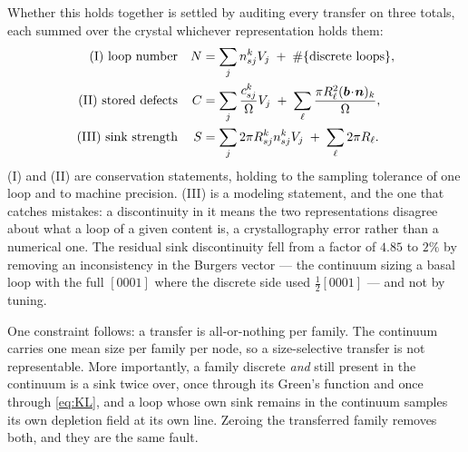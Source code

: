 Whether this holds together is settled by auditing every transfer on three
totals, each summed over the crystal whichever representation holds them:
\begin{align}
  \text{(I) loop number} &&
    N &= \sum_j n^k_{sj}V_j \;+\; \#\{\text{discrete loops}\}, \nonumber\\
  \text{(II) stored defects} &&
    C &= \sum_j \frac{c^k_{sj}}{\Omega}V_j
         \;+\; \sum_\ell \frac{\pi R_\ell^{2}(\bm{b}\!\cdot\!\bm{n})_k}{\Omega},
         \label{eq:ledger}\\
  \text{(III) sink strength} &&
    S &= \sum_j 2\pi R^k_{sj}n^k_{sj}V_j \;+\; \sum_\ell 2\pi R_\ell . \nonumber
\end{align}
(I) and (II) are conservation statements, holding to the sampling tolerance of
one loop and to machine precision. (III) is a modeling statement, and the one
that catches mistakes: a discontinuity in it means the two representations
disagree about what a loop of a given content is, a crystallography error rather
than a numerical one. The residual sink discontinuity fell from a
factor of $4.85$ to $2\%$ by removing an inconsistency in the \cloop{} Burgers
vector --- the continuum sizing a basal loop with the full $[0001]$ where the
discrete side used $\tfrac12[0001]$ --- and not by tuning.

One constraint follows: a transfer is all-or-nothing per family. The continuum
carries one mean size per family per node, so a size-selective transfer is not
representable. More importantly, a family discrete \emph{and} still present in
the continuum is a sink twice over, once through its Green's function and once
through \cref{eq:KL}, and a loop whose own sink remains in the continuum samples
its own depletion field at its own line. Zeroing the transferred family removes
both, and they are the same fault.

